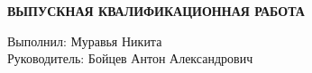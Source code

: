 \documentclass[a4paper, 14pt]{extreport}
\begin{document}
\begin{titlepage}
    \begin{center}
        \vspace*{4cm}
        \LARGE
        \textbf{ВЫПУСКНАЯ КВАЛИФИКАЦИОННАЯ РАБОТА}
        \vspace{2cm}
        
        \large
        Выполнил: Муравья Никита \\
        Руководитель: Бойцев Антон Александрович
    \end{center}
\end{titlepage}

\tableofcontents
\clearpage









\clearpage
\printbibliography[heading=bibintoc, title={Список использованной литературы}]


\end{document}
